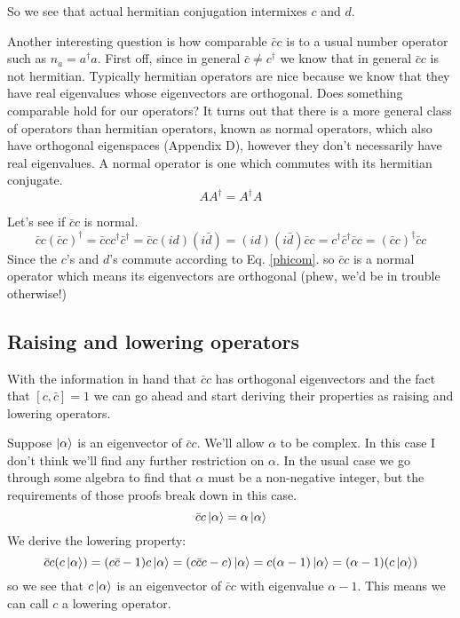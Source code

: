 \documentclass[12pt]{article}
\begin{document}
So we see that actual hermitian conjugation intermixes $c$ and $d$.

Another interesting question is how comparable $\bar{c}c$ is to a usual number operator such as $n_a = a^{\dag}a$. First off, since in general $\bar{c}\neq c^{\dag}$ we know that in general $\bar{c}c$ is not hermitian. Typically hermitian operators are nice because we know that they have real eigenvalues whose eigenvectors are orthogonal. Does something comparable hold for our operators? It turns out that there is a more general class of operators than hermitian operators, known as normal operators, which also have orthogonal eigenspaces (Appendix D), however they don't necessarily have real eigenvalues. A normal operator is one which commutes with its hermitian conjugate.
\begin{equation}
AA^{\dag} = A^{\dag}A
\end{equation}

Let's see if $\bar{c}c$ is normal.
\begin{equation}
\bar{c}c (\bar{c}c)^{\dag} = \bar{c}c c^{\dag} \bar{c}^{\dag} =
\bar{c}c (id) (i \bar{d}) = (id)(i\bar{d})\bar{c}c = c^{\dag}\bar{c}^{\dag}\bar{c}c = (\bar{c}c)^{\dag} \bar{c}c
\end{equation}
Since the $c$'s and $d$'s commute according to Eq. \ref{phicom}. so $\bar{c}c$ is a normal operator which means its eigenvectors are orthogonal (phew, we'd be in trouble otherwise!)

\subsection{Raising and lowering operators}
With the information in hand that $\bar{c}c$ has orthogonal eigenvectors and the fact that $[c,\bar{c}] = 1$ we can go ahead and start deriving their properties as raising and lowering operators.

Suppose $\ket{\alpha}$ is an eigenvector of $\bar{c}c$. We'll allow $\alpha$ to be complex. In this case I don't think we'll find any further restriction on $\alpha$. In the usual case we go through some algebra to find that $\alpha$ must be a non-negative integer, but the requirements of those proofs break down in this case.
\begin{equation}
\bar{c}c \ket{\alpha} = \alpha \ket{\alpha}
\end{equation}
We derive the lowering property:
\begin{equation}
\bar{c}c (c\ket{\alpha}) = (c \bar{c}-1)c \ket{\alpha} = (c \bar{c} c -c)\ket{\alpha} = c (\alpha-1) \ket{\alpha} = (\alpha-1) (c \ket{\alpha})
\end{equation}
so we see that $c \ket{\alpha}$ is an eigenvector of $\bar{c}c$ with eigenvalue $\alpha-1$. This means we can call $c$ a lowering operator.
\end{document}
